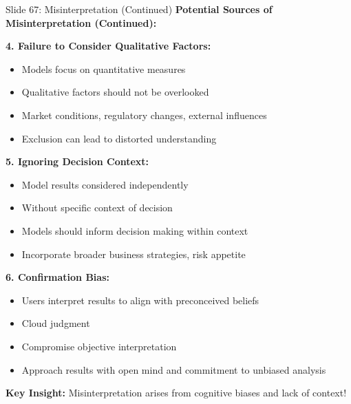 \documentclass[8pt]{beamer}
\begin{document}
	\begin{frame}{Slide 67: Misinterpretation (Continued)}
		\fontsize{6.5}{7.5}\selectfont
		\textbf{Potential Sources of Misinterpretation (Continued):}
		
		\vspace{0.1cm}
		\textbf{4. Failure to Consider Qualitative Factors:}
		\begin{itemize}
			\item Models focus on quantitative measures
			\item Qualitative factors should not be overlooked
			\item Market conditions, regulatory changes, external influences
			\item Exclusion can lead to distorted understanding
		\end{itemize}
		
		\vspace{0.1cm}
		\textbf{5. Ignoring Decision Context:}
		\begin{itemize}
			\item Model results considered independently
			\item Without specific context of decision
			\item Models should inform decision making within context
			\item Incorporate broader business strategies, risk appetite
		\end{itemize}
		
		\vspace{0.1cm}
		\textbf{6. Confirmation Bias:}
		\begin{itemize}
			\item Users interpret results to align with preconceived beliefs
			\item Cloud judgment
			\item Compromise objective interpretation
			\item Approach results with open mind and commitment to unbiased analysis
		\end{itemize}
		
		\textcolor{myblue}{\textbf{Key Insight:}} Misinterpretation arises from \textcolor{myblue}{cognitive biases and lack of context}!
	\end{frame}
	
\end{document}
